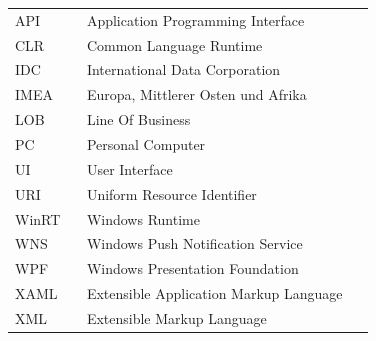 \documentclass[a4paper,bibtotoc,oneside]{scrbook}
\begin{document}
\hspace{-17mm}\begin{tabular}{>{\raggedleft}p{0.2\linewidth} p{0.75\linewidth} p{0.1\linewidth}}
API & Application Programming Interface \\
CLR & Common Language Runtime \\
IDC & International Data Corporation \\
IMEA & Europa, Mittlerer Osten und Afrika \\
LOB & Line Of Business \\
PC & Personal Computer \\
UI & User Interface \\
URI & Uniform Resource Identifier \\
WinRT & Windows Runtime \\
WNS &  Windows Push Notification Service \\
WPF & Windows Presentation Foundation \\
XAML & Extensible Application Markup Language \\
XML & Extensible Markup Language
\end{tabular}
\end{document}
